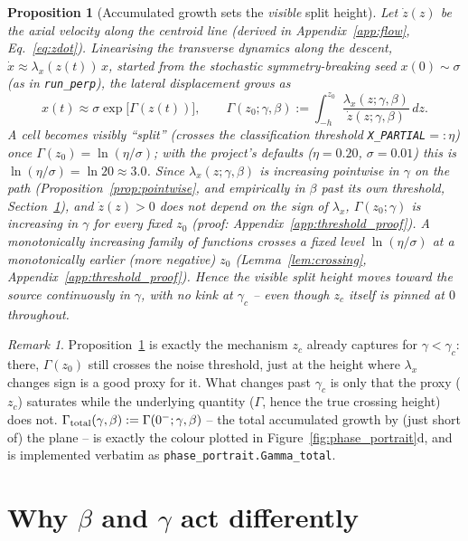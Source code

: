 \documentclass[11pt,a4paper]{article}
\theoremstyle{plain}
\newtheorem{proposition}[theorem]{Proposition}
\theoremstyle{definition}
\theoremstyle{remark}
\newtheorem{remark}[theorem]{Remark}
\newcommand{\lam}{\lambda}
\newcommand{\bw}{\beta}
\newcommand{\gc}{\gamma_c}
\begin{document}
\begin{proposition}[Accumulated growth sets the \emph{visible} split height]
\label{prop:threshold}
Let $\dot z(z)$ be the axial velocity along the centroid line (derived in
Appendix~\ref{app:flow}, Eq.~\eqref{eq:zdot}). Linearising the transverse
dynamics along the descent, $\dot x\approx\lam_x(z(t))\,x$, started from
the stochastic symmetry-breaking seed $x(0)\sim\sigma$ (as in
\texttt{run\_perp}), the lateral displacement grows as
\[
x(t)\approx\sigma\exp\big[\Gamma(z(t))\big],\qquad
\Gamma(z_0;\gamma,\bw):=\int_{-h}^{z_0}\frac{\lam_x(z;\gamma,\bw)}{\dot z(z;\gamma,\bw)}\,dz.
\]
A cell becomes visibly ``split'' (crosses the classification threshold
\texttt{X\_PARTIAL}$=:\eta$) once $\Gamma(z_0)=\ln(\eta/\sigma)$; with the
project's defaults ($\eta=0.20$, $\sigma=0.01$) this is
$\ln(\eta/\sigma)=\ln 20\approx3.0$. Since $\lam_x(z;\gamma,\bw)$ is
increasing pointwise in $\gamma$ on the path (Proposition~\ref{prop:pointwise},
and empirically in $\bw$ past its own threshold, Section~\ref{sec:beta_vs_gamma}),
and $\dot z(z)>0$ does not depend on the sign of $\lam_x$, $\Gamma(z_0;\gamma)$
is increasing in $\gamma$ for every fixed $z_0$ (proof: Appendix~\ref{app:threshold_proof}).
A monotonically increasing family of functions crosses a fixed level
$\ln(\eta/\sigma)$ at a monotonically earlier (more negative) $z_0$ (Lemma~\ref{lem:crossing},
Appendix~\ref{app:threshold_proof}). Hence the \emph{visible} split height
moves toward the source continuously in $\gamma$, with no kink at $\gc$ --
even though $z_c$ itself is pinned at $0$ throughout.
\end{proposition}

\begin{remark}
Proposition~\ref{prop:threshold} is exactly the mechanism $z_c$ already
captures for $\gamma<\gc$: there, $\Gamma(z_0)$ still crosses the noise
threshold, just at the height where $\lam_x$ changes sign is a good proxy
for it. What changes past $\gc$ is only that the proxy ($z_c$) saturates
while the underlying quantity ($\Gamma$, hence the true crossing height)
does not. $\Gamma_{\rm total}(\gamma,\bw):=\Gamma(0^-;\gamma,\bw)$ -- the
total accumulated growth by (just short of) the plane -- is exactly the
colour plotted in Figure~\ref{fig:phase_portrait}d, and is implemented
verbatim as \texttt{phase\_portrait.Gamma\_total}.
\end{remark}

\section{Why $\bw$ and $\gamma$ act differently}
\label{sec:beta_vs_gamma}
\end{document}
